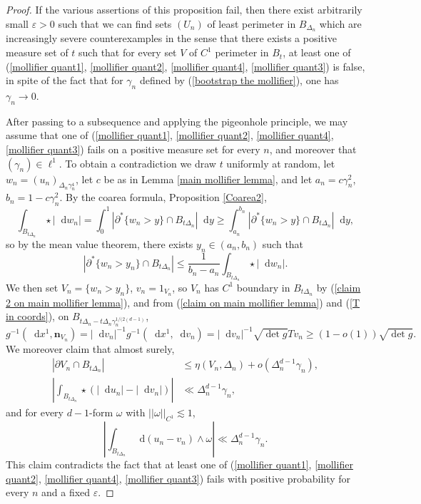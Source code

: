 \documentclass[reqno,12pt,letterpaper]{amsart}
\newcommand*\dif{\mathop{}\!\mathrm{d}}
\newcommand{\normal}{\mathbf n}
\theoremstyle{definition}
\numberwithin{equation}{section}
\begin{document}
\begin{proof}
If the various assertions of this proposition fail, then there exist arbitrarily small $\varepsilon > 0$ such that we can find sets $(U_n)$ of least perimeter in $B_{\Delta_n}$ which are increasingly severe counterexamples in the sense that there exists a positive measure set of $t$ such that for every set $V$ of $C^1$ perimeter in $B_t$, at least one of (\ref{mollifier quant1}, \ref{mollifier quant2}, \ref{mollifier quant4}, \ref{mollifier quant3}) is false, in spite of the fact that for $\gamma_n$ defined by (\ref{bootstrap the mollifier}), one has $\gamma_n \to 0$.

After passing to a subsequence and applying the pigeonhole principle, we may assume that one of (\ref{mollifier quant1}, \ref{mollifier quant2}, \ref{mollifier quant4}, \ref{mollifier quant3}) fails on a positive measure set for every $n$, and moreover that $(\gamma_n) \in \ell^1$.
To obtain a contradiction we draw $t$ uniformly at random, let $w_n = (u_n)_{\Delta_n \gamma_n^4}$, let $c$ be as in Lemma \ref{main mollifier lemma}, and let $a_n = c\gamma_n^2$, $b_n = 1 - c\gamma_n^2$.
By the coarea formula, Proposition \ref{Coarea2},
$$\int_{B_{t\Delta_n}} \star |\dif w_n| = \int_0^1 |\partial^* \{w_n > y\} \cap B_{t\Delta_n}| \dif y \geq \int_{a_n}^{b_n} |\partial^* \{w_n > y\} \cap B_{t\Delta_n}| \dif y,$$
so by the mean value theorem, there exists $y_n \in (a_n, b_n)$ such that
\begin{equation}\label{MVT mollifier}
|\partial^* \{w_n > y_n\} \cap B_{t\Delta_n}| \leq \frac{1}{b_n - a_n} \int_{B_{t\Delta_n}} \star |\dif w_n|.
\end{equation}
We then set $V_n = \{w_n > y_n\}$, $v_n = 1_{V_n}$, so $V_n$ has $C^1$ boundary in $B_{t\Delta_n}$ by (\ref{claim 2 on main mollifier lemma}), and from (\ref{claim on main mollifier lemma}) and (\ref{T in coords}), on $B_{t\Delta_n - t\Delta_n \gamma_n^{1/(2(d - 1)}}$,
\begin{equation}\label{mollifier prop4}
g^{-1}(\dif x^1, \normal_{V_n}) = |\dif v_n|^{-1} g^{-1}(\dif x^1, \dif v_n) = |\dif v_n|^{-1} \sqrt{\det g} Tv_n \geq (1 - o(1)) \sqrt{\det g}.
\end{equation}
We moreover claim that almost surely,\begin{align}
|\partial V_n \cap B_{t\Delta_n}| &\leq \eta(V_n, \Delta_n) + o(\Delta_n^{d - 1} \gamma_n), \label{mollifier prop1}\\
\left|\int_{B_{t\Delta_n}} \star(|\dif u_n| - |\dif v_n|)\right| &\ll \Delta_n^{d - 1} \gamma_n, \label{mollifier prop2}
\end{align}
and for every $d-1$-form $\omega$ with $||\omega||_{C^1} \lesssim 1$,
\begin{equation}
\left|\int_{B_{t\Delta_n}} \dif (u_n - v_n) \wedge \omega\right| \ll \Delta_n^{d - 1} \gamma_n. \label{mollifier prop3}
\end{equation}
This claim contradicts the fact that at least one of (\ref{mollifier quant1}, \ref{mollifier quant2}, \ref{mollifier quant4}, \ref{mollifier quant3}) fails with positive probability for every $n$ and a fixed $\varepsilon$.


\end{proof}
\end{document}
